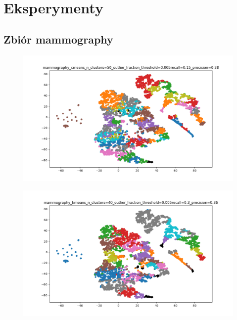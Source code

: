 \documentclass{classrep}
\begin{document}
    \section{Eksperymenty} {

        \subsection{Zbiór mammography} {

            \begin{figure}[!htbp]
                \centering
                \includegraphics[width=\textwidth]{img/mammography_cmeans_n_clusters=50_outlier_fraction_threshold=0,005-182204.png}
                \caption{}
                \label{fig:mamm_cmeans}
            \end{figure}

            \begin{figure}[!htbp]
                \centering
                \includegraphics[width=\textwidth]{img/mammography_kmeans_n_clusters=40_outlier_fraction_threshold=0,005-182326.png}
                \caption{}
                \label{fig:mamm_kmeans}
            \end{figure}

}}
\end{document}

